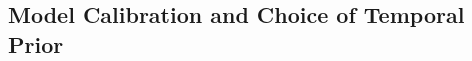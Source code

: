 \documentclass{article}
\begin{document}


\subsection{Model Calibration and Choice of Temporal Prior}
\label{sec:orga44afa6}



\end{document}
